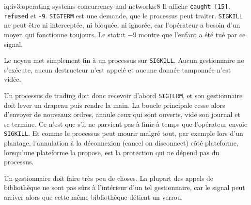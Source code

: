\begin{solution}{iq:iv3:operating-systems-concurrency-and-networks:8}
Il affiche \texttt{caught [15]}, \texttt{refused} et \texttt{-9}. \texttt{SIGTERM} est une demande, que le processus peut traiter. \texttt{SIGKILL} ne peut être ni interceptée, ni bloquée, ni ignorée, car l'opérateur a besoin d'un moyen qui fonctionne toujours. Le statut $-9$ montre que l'enfant a été tué par ce signal.

Le noyau met simplement fin à un processus sur \texttt{SIGKILL}. Aucun gestionnaire ne s'exécute, aucun destructeur n'est appelé et aucune donnée tamponnée n'est vidée.

Un processus de trading doit donc recevoir d'abord \texttt{SIGTERM}, et son gestionnaire doit lever un drapeau puis rendre la main. La boucle principale cesse alors d'envoyer de nouveaux ordres, annule ceux qui sont ouverts, vide son journal et se termine. Ce n'est que s'il ne parvient pas à finir à temps que l'opérateur envoie \texttt{SIGKILL}. Et comme le processus peut mourir malgré tout, par exemple lors d'un plantage, l'annulation à la déconnexion (cancel on disconnect) côté plateforme, lorsqu'une plateforme la propose, est la protection qui ne dépend pas du processus.

Un gestionnaire doit faire très peu de choses. La plupart des appels de bibliothèque ne sont pas sûrs à l'intérieur d'un tel gestionnaire, car le signal peut arriver alors que cette même bibliothèque détient un verrou.

\end{solution}

